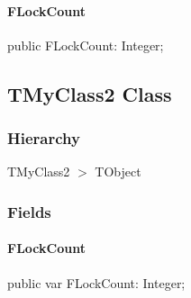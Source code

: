 \documentclass{report}
\begin{document}
\paragraph*{FLockCount}\hspace*{\fill}

\begin{list}{}{
\setlength{\itemindent}{0cm}
\setlength{\listparindent}{0cm}
\setlength{\leftmargin}{\evensidemargin}
\addtolength{\leftmargin}{\tmplength}
\settowidth{\labelsep}{X}
\addtolength{\leftmargin}{\labelsep}
\setlength{\labelwidth}{\tmplength}
}
\begin{flushleft}
\item[\textbf{Declaration}\hfill]
\begin{ttfamily}
public FLockCount: Integer;\end{ttfamily}


\end{flushleft}
\end{list}
\subsection*{TMyClass2 Class}
\subsubsection*{\large{\textbf{Hierarchy}}\normalsize\hspace{1ex}\hfill}
TMyClass2 {$>$} TObject
\subsubsection*{\large{\textbf{Fields}}\normalsize\hspace{1ex}\hfill}
\paragraph*{FLockCount}\hspace*{\fill}

\begin{list}{}{
\setlength{\itemindent}{0cm}
\setlength{\listparindent}{0cm}
\setlength{\leftmargin}{\evensidemargin}
\addtolength{\leftmargin}{\tmplength}
\settowidth{\labelsep}{X}
\addtolength{\leftmargin}{\labelsep}
\setlength{\labelwidth}{\tmplength}
}
\begin{flushleft}
\item[\textbf{Declaration}\hfill]
\begin{ttfamily}
public var FLockCount: Integer;\end{ttfamily}


\end{flushleft}
\end{list}
\end{document}

